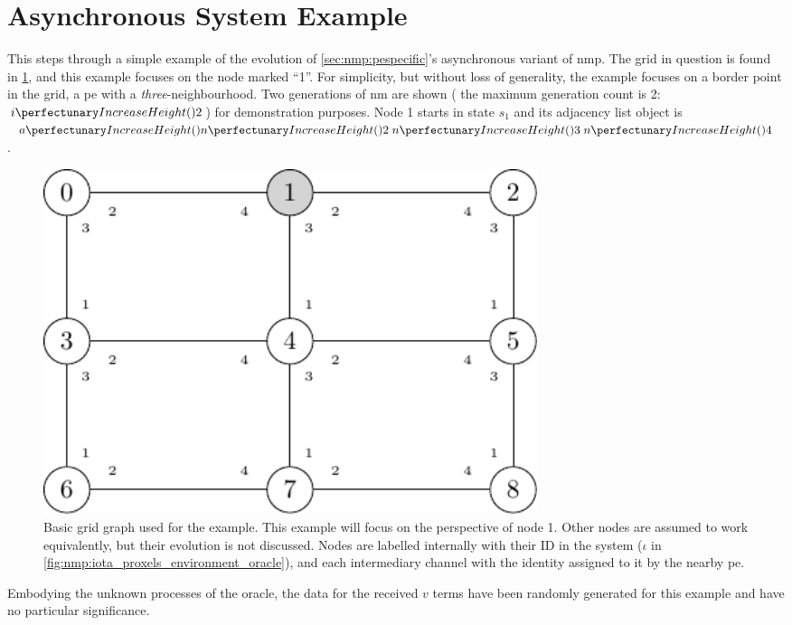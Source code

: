\section{\label{sec:nmp:example}Asynchronous System Example}
\newcommand*{\obinnod}[1]{Objects inside node 1 at the end of round #1}
\newcommand*{\obinrul}[2]{Objects inside node 1 after application of rule#1 during round #2}

This  steps through a simple example of the evolution of \cref{sec:nmp:pespecific}'s asynchronous variant of \gls{nmp}.  The grid in question is found in \cref{fig:nmp:basicgrid}, and this example focuses on the node marked ``1''.  For simplicity, but without loss of generality, the example focuses on a border point in the grid, \ie{} a \gls{pe} with a \emph{three}-neighbourhood.  Two generations of \gls{nm} are shown (\ie{} the maximum generation count is 2: \(\cpfunc{i}{2}\)) for demonstration purposes.  Node 1 starts in state \(s_1\) and its adjacency list object is \(\cpfunc{a}{\cpfunc{n}{2} \; \cpfunc{n}{3} \;\cpfunc{n}{4}}\).

\begin{figure}
    \centering
    \includegraphics[keepaspectratio,width=0.7\textwidth,height=0.3\textheight]{chapters/nmp/images/3by3gridgraph.pdf}
    \caption[Basic  grid graph used for the example]{Basic  grid graph used for the example.  This example will focus on the perspective of node 1.  Other nodes are assumed to work equivalently, but their evolution is not discussed.  Nodes are labelled internally with their ID in the system (\(\iota\) in \cref{fig:nmp:iota_proxels_environment_oracle}), and each intermediary channel with the identity assigned to it by the nearby \gls{pe}.}
    \label{fig:nmp:basicgrid}
\end{figure}

Embodying the unknown processes of the oracle, the data for the received \(v\) terms have been randomly generated for this example and have no particular significance.

